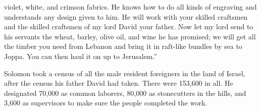 {violet,
white,
and crimson
fabrics. He knows how to do
all
kinds of engraving
and understands
any
design
given
to him. He will work with
your skilled craftsmen
and the skilled craftsmen
of my lord
David
your father.
Now
let my lord
send
to his servants
the wheat,
barley,
olive oil,
and wine
he has promised;
we
will get
all
the timber
you need
from
Lebanon
and bring
it in raft-like
bundles by sea
to Joppa.
You
can then haul it on up
to Jerusalem.”
\par }{\PP {}Solomon
took a census
of all
the male
resident foreigners
in the land
of Israel,
after
the census
his father
David
had taken.
There were
153,600 in all.
He designated
70,000
as common laborers,
80,000
as stonecutters
in the hills,
and 3,600
as supervisors
to make sure the people
completed the work.

}
